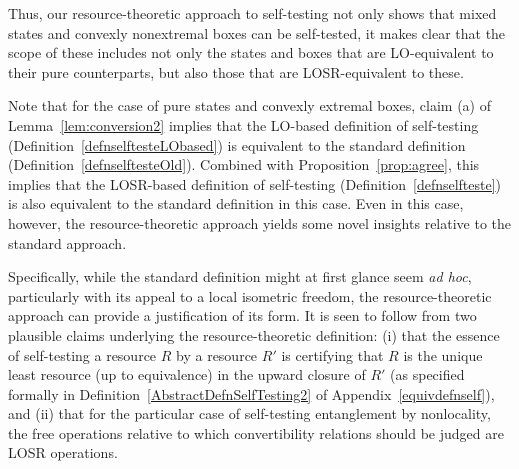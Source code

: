 \documentclass[prx,11pt,letterpaper,twocolumn,accepted=2023-11-27]{quantumarticle}
\theoremstyle{plain}
\theoremstyle{definition}
\begin{document}
Thus, our resource-theoretic approach to self-testing not only shows that mixed states and convexly nonextremal boxes can be self-tested, it makes clear that the scope of these includes not only the states and boxes that are LO-equivalent to their pure counterparts, but also those that are LOSR-equivalent to these. 


Note that for the case of pure states and convexly extremal boxes, claim (a) of Lemma~\ref{lem:conversion2} implies that the LO-based definition of self-testing (Definition~\ref{defnselftesteLObased}) is equivalent to the standard definition (Definition~\ref{defnselftesteOld}).  Combined with Proposition~\ref{prop:agree}, this implies that the LOSR-based definition of self-testing (Definition~\ref{defnselfteste}) is also equivalent to the standard definition in this case.  Even in this case, however, the resource-theoretic approach yields some novel insights relative to the standard approach. 



Specifically, while the standard definition might at first glance seem {\em ad hoc}, particularly with its appeal to a local isometric freedom, the resource-theoretic approach can provide a justification of its form.
It is seen to follow from two plausible claims underlying the resource-theoretic definition: (i) that 
  the essence of self-testing a resource $R$ by a resource $R'$ is certifying that $R$ is the unique least resource (up to equivalence) in the upward closure of $R'$
(as specified formally in Definition~\ref{AbstractDefnSelfTesting2} of Appendix~\ref{equivdefnself}),
  and (ii)    that for the particular case of self-testing entanglement by nonlocality,
the free operations relative to which convertibility relations should be judged are LOSR operations.
\end{document}
